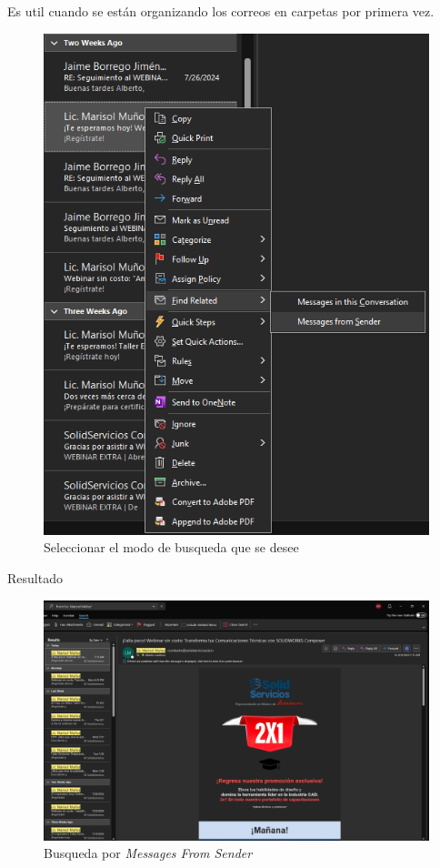 \documentclass{report}
\begin{document}
Es util cuando se están organizando los correos en carpetas por primera vez.

\begin{figure}[H]
	\centering
	\includegraphics[width=0.85\linewidth, height=0.5\textheight,keepaspectratio]{Imagenes/outlook_findrelated01}
	\caption{Seleccionar el modo de busqueda que se desee}
	\label{fig:outlookfindrelated01}
\end{figure}

\vskip50pt

{\LARGE Resultado}

\begin{figure}[H]
	\centering
	\includegraphics[width=0.95\linewidth, height=0.55\textheight,keepaspectratio]{Imagenes/outlook_findrelated02}
	\caption{Busqueda por \emph{Messages From Sender}}
	\label{fig:outlookfindrelated02}
\end{figure}
\end{document}
